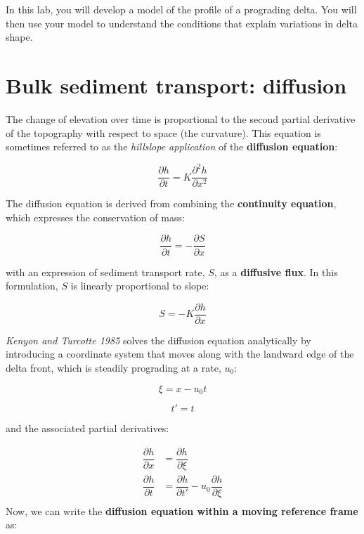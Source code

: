 In this lab, you will develop a model of the profile of a prograding delta. You will then use your model to understand the conditions that explain variations in delta shape.


\section{Bulk sediment transport: diffusion}
The change of elevation over time is proportional to the second partial derivative of the topography with respect to space (the curvature). This equation is sometimes referred to as the \textit{hillslope application} of the \textbf{diffusion equation}:

\begin{equation*}
	\dfrac{\partial h}{\partial t} = K \dfrac{\partial^2 h}{\partial x^2} \label{eq:diff}\tag{diffusion equation}
\end{equation*}

The diffusion equation is derived from combining the  \textbf{continuity equation}, which expresses the conservation of mass:

\begin{equation*}
	\dfrac{\partial h}{\partial t} = - \dfrac{\partial S}{\partial x} \label{eq:cont}\tag{continuity equation}
\end{equation*}

with an expression of sediment transport rate, $S$, as a \textbf{diffusive flux}. In this formulation, $S$ is linearly proportional to slope:

\begin{equation*} S = - K \dfrac{\partial h}{\partial x}\tag{diffusive flux}
\end{equation*}

\emph{Kenyon and Turcotte 1985} solves the diffusion equation analytically by introducing a coordinate system that moves along with the landward edge of the delta front, which is steadily prograding at a rate, $u_0$:

\begin{equation*}
	\xi = x - u_0t
\end{equation*}

\begin{equation*}
	t'  = t \label{eq:mrf}
	\tag{moving reference frame}
\end{equation*}

and the associated partial derivatives:

\begin{align*}
	\dfrac{\partial h}{\partial x} & =\dfrac{\partial h}{\partial \xi}                                      \\
	\dfrac{\partial h}{\partial t} & =\dfrac{\partial h}{\partial t'} - u_0\dfrac{\partial h}{\partial \xi} \\
\end{align*}
Now, we can write the \textbf{diffusion equation within a moving reference frame} as:

